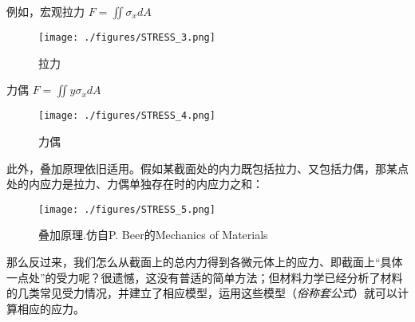 例如，宏观拉力 $F = \iint \sigma_x dA$
\begin{figure}[ht]
\centering
\texttt{[image: ./figures/STRESS\_3.png]}
\caption{拉力} \label{STRESS_fig3}
\end{figure}

力偶 $F = \iint y\sigma_x dA$
\begin{figure}[ht]
\centering
\texttt{[image: ./figures/STRESS\_4.png]}
\caption{力偶} \label{STRESS_fig4}
\end{figure}

此外，叠加原理依旧适用。假如某截面处的内力既包括拉力、又包括力偶，那某点处的内应力是拉力、力偶单独存在时的内应力之和：
\begin{figure}[ht]
\centering
\texttt{[image: ./figures/STRESS\_5.png]}
\caption{叠加原理.仿自P. Beer的Mechanics of Materials} \label{STRESS_fig5}
\end{figure}

那么反过来，我们怎么从截面上的总内力得到各微元体上的应力、即截面上“具体一点处”的受力呢？很遗憾，这没有普适的简单方法；但材料力学已经分析了材料的几类常见受力情况，并建立了相应模型，运用这些模型（\textsl{俗称套公式}）就可以计算相应的应力。
